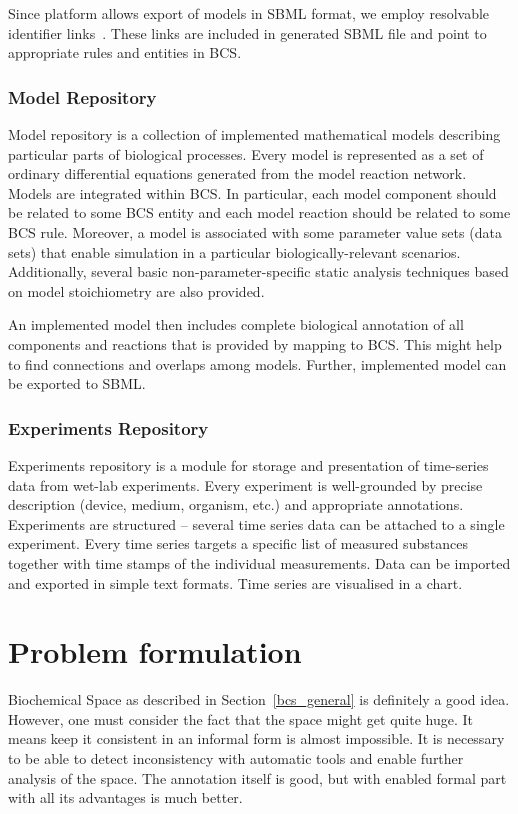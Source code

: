 \documentclass[12pt]{fithesis2}
\begin{document}
Since platform allows export of models in SBML format, we employ resolvable identifier links~\cite{juty2011identifiers}. These links are included in generated SBML file and point to appropriate rules and entities in BCS. 

\subsection{Model Repository}
\label{model}

Model repository is a collection of implemented mathematical models describing particular parts of biological processes. Every model is represented as a set of ordinary differential equations generated from the model reaction network. Models are integrated within BCS. In particular, each model component should be related to some BCS entity and each model reaction should be related to some BCS rule. Moreover, a model is associated with some parameter value sets (data sets) that enable simulation in a particular biologically-relevant scenarios. Additionally, several basic non-parameter-specific static analysis techniques based on model stoichiometry are also provided.

An implemented model then includes complete biological annotation of all components and reactions that is provided by mapping to BCS. This might help to find connections and overlaps among models. Further, implemented model can be exported to SBML.

\subsection{Experiments Repository}

Experiments repository is a module for storage and presentation of time-series data from wet-lab experiments. Every experiment is well-grounded by precise description (device, medium, organism, etc.) and appropriate annotations. Experiments are structured -- several time series data can be attached to a single experiment. Every time series targets a specific list of measured substances together with time stamps of the individual measurements. Data can be imported and exported in simple text formats. Time series are visualised in a chart.

\chapter{Problem formulation}
\label{problem_formulation}

Biochemical Space as described in Section~\ref{bcs_general} is definitely a good idea. However, one must consider the fact that the space might get quite huge. It means keep it consistent in an informal form is almost impossible. It is necessary to be able to detect inconsistency with automatic tools and enable further analysis of the space. The annotation itself is good, but with enabled formal part with all its advantages is much better. 
\end{document}
